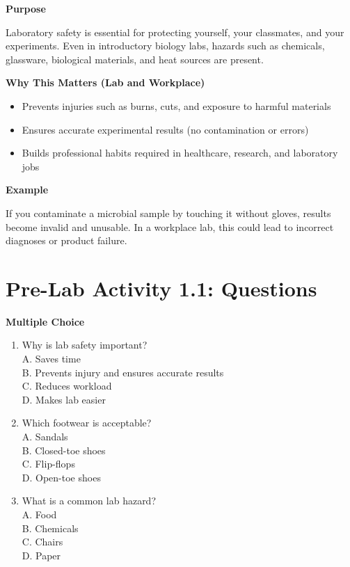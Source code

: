 \documentclass[
  letterpaper,
  DIV=11,
  numbers=noendperiod]{scrreprt}
\begin{document}
\textbf{Purpose}

Laboratory safety is essential for protecting yourself, your classmates,
and your experiments. Even in introductory biology labs, hazards such as
chemicals, glassware, biological materials, and heat sources are
present.

\textbf{Why This Matters (Lab and Workplace)}

\begin{itemize}
\item
  Prevents injuries such as burns, cuts, and exposure to harmful
  materials
\item
  Ensures accurate experimental results (no contamination or errors)
\item
  Builds professional habits required in healthcare, research, and
  laboratory jobs
\end{itemize}

\textbf{Example}

If you contaminate a microbial sample by touching it without gloves,
results become invalid and unusable. In a workplace lab, this could lead
to incorrect diagnoses or product failure.

\section{\texorpdfstring{\textbf{Pre-Lab Activity 1.1:
Questions}}{Pre-Lab Activity 1.1: Questions}}\label{pre-lab-activity-1.1-questions}

\textbf{Multiple Choice}

\begin{enumerate}
\def\labelenumi{\arabic{enumi}.}
\item
  Why is lab safety important?\\
  A. Saves time\\
  B. Prevents injury and ensures accurate results\\
  C. Reduces workload\\
  D. Makes lab easier
\item
  Which footwear is acceptable?\\
  A. Sandals\\
  B. Closed-toe shoes\\
  C. Flip-flops\\
  D. Open-toe shoes
\item
  What is a common lab hazard?\\
  A. Food\\
  B. Chemicals\\
  C. Chairs\\
  D. Paper
\end{enumerate}
\end{document}
